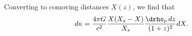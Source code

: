 Converting to comoving distances $X(z)$, we find that
\begin{equation}
d\kappa = \frac{4 \pi G}{c^2}\frac{X (X_s - X)}{X_s} \frac{\drho_p\,dz}{(1+z)^2} dX.
\label{eq:dkappa}
\end{equation}
  